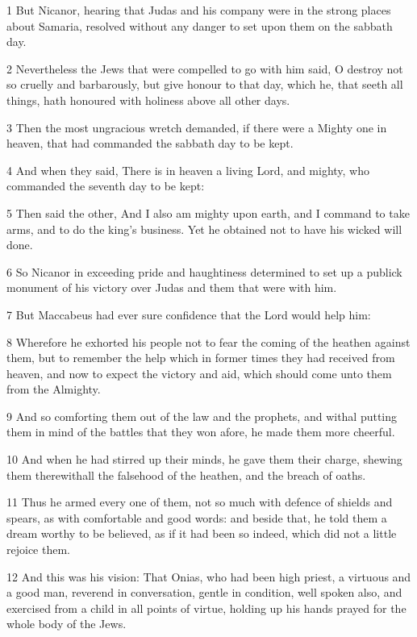 \par 1 But Nicanor, hearing that Judas and his company were in the strong places about Samaria, resolved without any danger to set upon them on the sabbath day.
\par 2 Nevertheless the Jews that were compelled to go with him said, O destroy not so cruelly and barbarously, but give honour to that day, which he, that seeth all things, hath honoured with holiness above all other days.
\par 3 Then the most ungracious wretch demanded, if there were a Mighty one in heaven, that had commanded the sabbath day to be kept.
\par 4 And when they said, There is in heaven a living Lord, and mighty, who commanded the seventh day to be kept:
\par 5 Then said the other, And I also am mighty upon earth, and I command to take arms, and to do the king's business. Yet he obtained not to have his wicked will done.
\par 6 So Nicanor in exceeding pride and haughtiness determined to set up a publick monument of his victory over Judas and them that were with him.
\par 7 But Maccabeus had ever sure confidence that the Lord would help him:
\par 8 Wherefore he exhorted his people not to fear the coming of the heathen against them, but to remember the help which in former times they had received from heaven, and now to expect the victory and aid, which should come unto them from the Almighty.
\par 9 And so comforting them out of the law and the prophets, and withal putting them in mind of the battles that they won afore, he made them more cheerful.
\par 10 And when he had stirred up their minds, he gave them their charge, shewing them therewithall the falsehood of the heathen, and the breach of oaths.
\par 11 Thus he armed every one of them, not so much with defence of shields and spears, as with comfortable and good words: and beside that, he told them a dream worthy to be believed, as if it had been so indeed, which did not a little rejoice them.
\par 12 And this was his vision: That Onias, who had been high priest, a virtuous and a good man, reverend in conversation, gentle in condition, well spoken also, and exercised from a child in all points of virtue, holding up his hands prayed for the whole body of the Jews.
